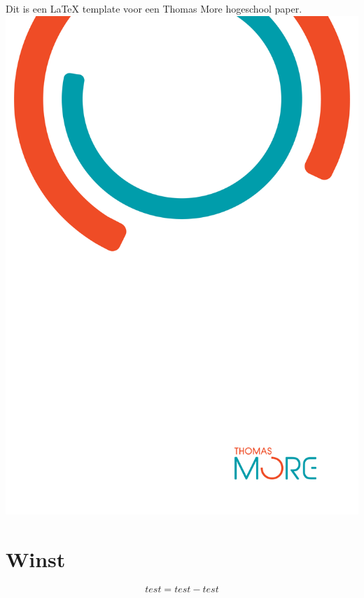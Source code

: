 \documentclass[11pt, a4paper, oneside]{article}
\begin{document}
Dit is een LaTeX template voor een Thomas More hogeschool paper.
 \includegraphics[scale=0.5]{images/ThomasMoreBackground.png}

\newpage

\chapter{Winst}

	\begin{mdframed}[backgroundcolor=grijs!40,shadow=false,roundcorner=8pt]
		$$test = test - test$$
	\end{mdframed}


\end{document}
